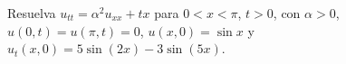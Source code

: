 Resuelva $u_{tt}=\alpha^2u_{xx}+tx$ para $0<x<\pi$, $t>0$, con $\alpha>0$, $u(0,t)=u(\pi,t)=0$, $u(x,0)=\sin x$ y $u_t(x,0)=5\sin(2x)-3\sin(5x)$.
